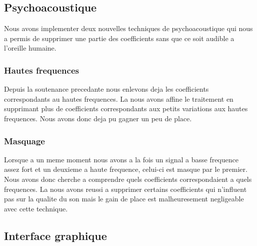 \documentclass[a4paper,12pt]{report}
\begin{document}
\subsection{Psychoacoustique}
Nous avons implementer deux nouvelles techniques de psychoacoustique
qui nous a permis de supprimer une partie des coefficients sans que ce
soit audible a l'oreille humaine.
\subsubsection{Hautes frequences}
Depuis la soutenance precedante nous enlevons deja les coefficients
correspondants au hautes frequences. La nous avons affine le
traitement en supprimant plus de coefficients correspondants aux
petits variations aux hautes frequences. Nous avons donc deja pu
gagner un peu de place.
\subsubsection{Masquage}
Lorsque a un meme moment nous avons a la fois un signal a basse
frequence assez fort et un deuxieme a haute frequence, celui-ci est
masque par le premier. Nous avons donc cherche a comprendre quels
coefficients correspondaient a quels frequences. La nous avons reussi
a supprimer certains coefficients qui n'influent pas sur la qualite du
son mais le gain de place est malheuresement negligeable avec cette technique.
\subsection{Interface graphique}
\end{document}
